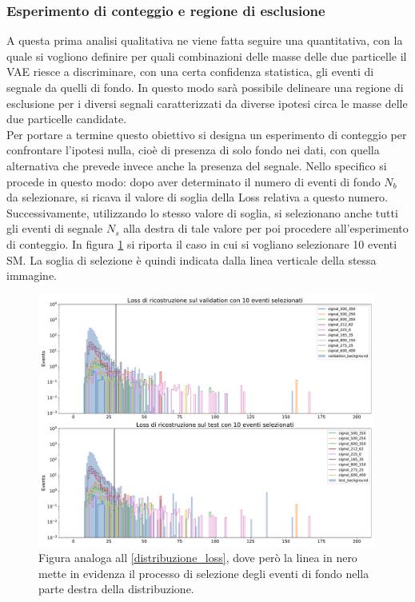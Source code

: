 \newpage


\subsubsection{Esperimento di conteggio e regione di esclusione}
\label{esperimento di conteggio e regione di esclusione}

A questa prima analisi qualitativa ne viene fatta seguire una quantitativa, con la quale si vogliono definire per quali combinazioni delle masse delle due particelle il VAE riesce a discriminare, con una certa confidenza statistica, gli eventi di segnale da quelli di fondo. In questo modo sarà possibile delineare una regione di esclusione per i diversi segnali caratterizzati da diverse ipotesi circa le masse delle due particelle candidate.\\
Per portare a termine questo obiettivo si designa un esperimento di conteggio per confrontare l'ipotesi nulla, cioè di presenza di solo fondo nei dati, con quella alternativa che prevede invece anche la presenza del segnale. Nello specifico si procede in questo modo: dopo aver determinato il numero di eventi di fondo $N_b$ da selezionare, si ricava il valore di soglia della Loss relativa a questo numero. Successivamente, utilizzando lo stesso valore di soglia, si selezionano anche tutti gli eventi di segnale $N_s$ alla destra di tale valore per poi procedere all'esperimento di conteggio. In figura \ref{distribuzioneLossRiga} si riporta il caso in cui si vogliano selezionare 10 eventi SM. La soglia di selezione è quindi indicata dalla linea verticale della stessa immagine.

\begin{figure}[h!]
	\centering
	\includegraphics[width=0.99\textwidth]{figs/risultati_simulazione/distribuzioneLossRiga.pdf}
	\caption{Figura analoga all \ref{distribuzione_loss}, dove però la linea in nero mette in evidenza il processo di selezione degli eventi di fondo nella parte destra della distribuzione.}
	\label{distribuzioneLossRiga}
\end{figure}

